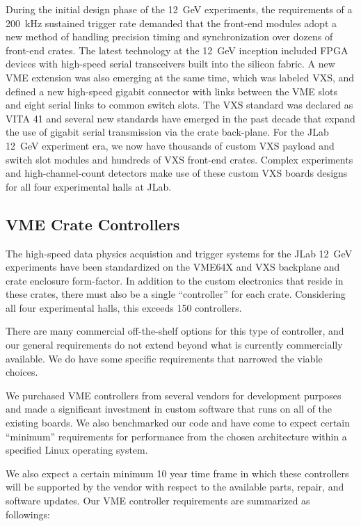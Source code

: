 During the initial design phase of the 12~GeV experiments, the requirements of a 200~kHz sustained trigger rate demanded that the front-end modules adopt a new method of handling precision timing and synchronization over dozens of front-end crates. The latest technology at the 12~GeV inception included FPGA devices with high-speed serial transceivers built into the silicon fabric. A new VME extension was also emerging at the same time, which was labeled VXS, and defined a new high-speed gigabit connector with links between the VME slots and eight serial links to common switch slots. The VXS standard was declared as VITA 41 and several new standards have emerged in the past decade that expand the use of gigabit serial transmission via the crate back-plane. For the JLab 12~GeV experiment era, we now have thousands of custom VXS payload and switch slot modules and hundreds of VXS front-end crates. Complex experiments and high-channel-count detectors make use of these custom VXS boards  designs for all four experimental halls at JLab.

\subsection{VME Crate Controllers}

The high-speed data physics acquistion and trigger systems for the JLab 12~GeV experiments have been standardized on the VME64X and VXS backplane and crate enclosure form-factor. In addition to the custom electronics that reside in these crates, there must also be a single ``controller'' for each crate. Considering all four experimental halls, this exceeds 150 controllers.

There are many commercial off-the-shelf options for this type of controller, and our general requirements do not extend beyond what is currently commercially available. We do have some specific requirements that narrowed the viable choices.

We purchased VME controllers from several vendors for development purposes and made a significant investment in custom software that runs on all of the existing boards. We also benchmarked our code and have come to expect certain ``minimum'' requirements for performance from the chosen architecture within a specified Linux operating system.

We also expect a certain minimum 10 year time frame in which these controllers will be supported by the vendor with respect to the available parts, repair, and software updates. Our VME controller requirements are summarized as followings:

